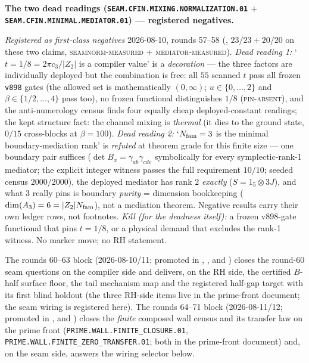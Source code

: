 \par\smallskip\noindent\textbf{The two dead readings
(\texttt{SEAM.CFIN.MIXING.\allowbreak NORMALIZATION.01} $+$
\texttt{SEAM.CFIN.MINIMAL.\allowbreak MEDIATOR.01}) ---
registered negatives.}
{\sloppy
\emph{Registered as first-class negatives} 2026-08-10, rounds
57--58 (, $23/23 + 20/20$ on
these two claims, \textsc{seamnorm-measured} $+$
\textsc{mediator-measured}).  \emph{Dead reading 1:} `$t = 1/8 =
2\pi c_3/|Z_2|$ is a compiler value' is a \emph{decoration} ---
the three factors are individually deployed but the combination
is free: all $55$ scanned $t$ pass all frozen \texttt{v898} gates
(the allowed set is mathematically $(0, \infty)$; $u \in \{0,
\ldots, 2\}$ and $\beta \in \{1/2, \ldots, 4\}$ pass too), no
frozen functional distinguishes $1/8$ (\textsc{pin-absent}), and
the anti-numerology census finds four equally cheap
deployed-constant readings; the kept structure fact: the channel
mixing is \emph{thermal} (it dies to the ground state, $0/15$
cross-blocks at $\beta = 100$).  \emph{Dead reading 2:}
`$N_{\rm fam} = 3$ is the minimal boundary-mediation rank' is
\emph{refuted} at theorem grade for this finite size --- one
boundary pair suffices ($\det B_x = \gamma_{ab}\gamma_{cde}$
symbolically for every symplectic-rank-1 mediator; the explicit
integer witness passes the full requirement $10/10$; seeded
census $2000/2000$), the deployed mediator has rank $2$
\emph{exactly} ($S = 1_5 \otimes 3J$), and what $3$ really pins
is boundary \emph{purity} = dimension bookkeeping
($\dim(A_3) = 6 = |Z_2| N_{\rm fam}$), not a mediation theorem.
Negative results carry their own ledger rows, not footnotes.
\emph{Kill (for the deadness itself):} a frozen v898-gate
functional that pins $t = 1/8$, or a physical demand that
excludes the rank-1 witness.  No marker move; no RH
statement.\par}

\par\smallskip\noindent The rounds 60--63 block (2026-08-10/11;
promoted in ,
,
 and
) closes the round-60
seam questions on the compiler side and delivers, on the RH
side, the certified $B$-half surface floor, the tail mechanism
map and the registered half-gap target with its first blind
holdout (the three RH-side items live in the prime-front
document; the seam wiring is registered here).  The rounds
64--71 block (2026-08-11/12; promoted in
,
 and
) closes the \emph{finite}
composed wall census and its transfer law on the prime front
(\texttt{PRIME.WALL.FINITE\_CLOSURE.01},
\texttt{PRIME.WALL.FINITE\_ZERO\_TRANSFER.01}; both in the
prime-front document) and, on the seam side, answers the wiring
selector below.


